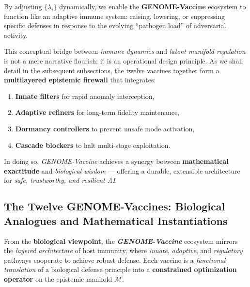 By adjusting $\{\lambda_i\}$ dynamically, we enable the \textbf{GENOME-Vaccine} ecosystem to function like an adaptive immune system: raising, lowering, or suppressing specific defenses in response to the evolving ``pathogen load'' of adversarial activity. 

This conceptual bridge between \emph{immune dynamics} and \emph{latent manifold regulation} is not a mere narrative flourish; it is an operational design principle. As we shall detail in the subsequent subsections, the twelve vaccines together form a \textbf{multilayered epistemic firewall} that integrates:
\begin{enumerate}
    \item \textbf{Innate filters} for rapid anomaly interception,
    \item \textbf{Adaptive refiners} for long-term fidelity maintenance,
    \item \textbf{Dormancy controllers} to prevent unsafe mode activation,
    \item \textbf{Cascade blockers} to halt multi-stage exploitation.
\end{enumerate}
In doing so, \emph{GENOME-Vaccine} achieves a synergy between \textbf{mathematical exactitude} and \emph{biological wisdom} --- offering a durable, extensible architecture for \emph{safe, trustworthy, and resilient AI}.


\subsection{The Twelve GENOME-Vaccines: Biological Analogues and Mathematical Instantiations}

From the \textbf{biological viewpoint}, the \textbf{\emph{GENOME-Vaccine}} ecosystem mirrors the \emph{layered architecture} of host immunity, where \emph{innate}, \emph{adaptive}, and \emph{regulatory} pathways cooperate to achieve robust defense. Each vaccine is a \emph{functional translation} of a biological defense principle into a \textbf{constrained optimization operator} on the epistemic manifold $\mathcal{M}$. 


